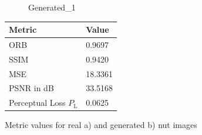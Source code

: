 \documentclass[12pt,DIV14,BCOR12mm,a4paper,footinclude=false,headinclude,parskip=half-,twoside,openright,cleardoublepage=empty,toc=index,bibliography=totoc,listof=totoc]{scrreprt}
\numberwithin{equation}{chapter}
\begin{document}
\begin{figure}
\begin{minipage}[H]{\linewidth}
\begin{minipage}[H]{0.5\linewidth}
\begin{subfigure}[t]{0.48\linewidth}
                \caption{Generated\_1}
            \end{subfigure}
        \end{minipage}%
        \hfill
        \begin{minipage}[H]{0.5\linewidth} %
            \centering
            \small
            \begin{tabular}{p{3cm} p{2cm}}
                \toprule
                \textbf{Metric} & \textbf{Value} \\
                \midrule
                ORB             & 0.9697        \\
                SSIM            & 0.9420        \\
                MSE             & 18.3361       \\
                PSNR in dB      & 33.5168       \\
                Perceptual Loss \( P_{\text{L}} \) & 0.0625        \\
                \bottomrule
            \end{tabular}
        \end{minipage}%
        \caption{Metric values for real a) and generated b) nut images}
        \label{fig:comparison_metrics_real_generated_nut}
    \end{minipage}
\end{figure}
\end{document}
